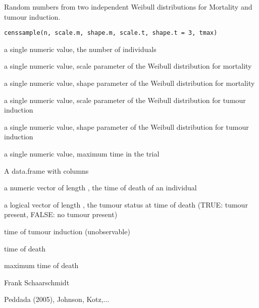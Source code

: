 \begin{Description}\relax
Random numbers from two independent Weibull distributions for Mortality and tumour induction.
\end{Description}
\begin{Usage}
\begin{verbatim}
censsample(n, scale.m, shape.m, scale.t, shape.t = 3, tmax)
\end{verbatim}
\end{Usage}
\begin{Arguments}
\begin{ldescription}
\item[\code{n}] a single numeric value, the number of individuals 
\item[\code{scale.m}] a single numeric value, scale parameter of the Weibull distribution for mortality 
\item[\code{shape.m}] a single numeric value, shape parameter of the Weibull distribution for mortality 
\item[\code{scale.t}] a single numeric value, scale parameter of the Weibull distribution for tumour induction 
\item[\code{shape.t}] a single numeric value, shape parameter of the Weibull distribution for tumour induction 
\item[\code{tmax}] a single numeric value, maximum time in the trial 
\end{ldescription}
\end{Arguments}
\begin{Details}\relax
\end{Details}
\begin{Value}
A data.frame with columns
\begin{ldescription}
\item[\code{time }] a numeric vector of length , the time of death of an individual
\item[\code{status }] a logical vector of length , the tumour status at time of death (TRUE: tumour present, FALSE: no tumour present)
\item[\code{T.t}] time of tumour induction (unobservable)
\item[\code{T.m}] time of death
\item[\code{tmax}] maximum time of death
\end{ldescription}
\end{Value}
\begin{Author}\relax
Frank Schaarschmidt
\end{Author}
\begin{References}\relax
Peddada (2005), Johnson, Kotz,...
\end{References}


